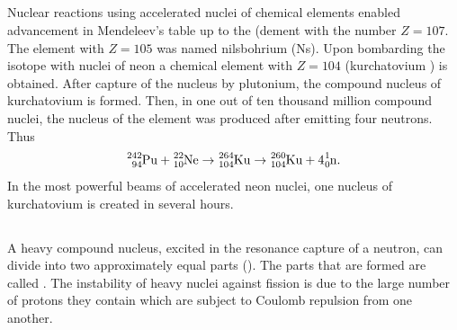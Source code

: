 \subsection{}\label{42.9.9} Nuclear reactions using accelerated nuclei of chemical elements enabled advancement in Mendeleev's table up to the (dement with the number $Z = 107$. The element with $Z = 105$ was named nilsbohrium (Ns). Upon bombarding the isotope  with nuclei of neon  a chemical element with $Z = 104$
(kurchatovium ) is obtained. After capture of the nucleus  by plutonium, the compound nucleus of kurchatovium  is formed. Then, in one out of ten thousand million compound
nuclei, the nucleus of the element  was produced after emitting four neutrons. Thus
\begin{equation*}
\ce{^{242}_{94}Pu} + \ce{^{22}_{10}Ne} \to \ce{^{264}_{104}Ku} \to \ce{^{260}_{104}Ku} + 4\ce{^{1}_{0}n}.
\end{equation*}
In the most powerful beams of accelerated neon nuclei, one nucleus of kurchatovium is created in several hours.

\subsection{}\label{42.9.10} A heavy compound nucleus, excited in the resonance capture of a neutron, can divide into two approximately equal parts (). The parts that are formed are called . The instability of heavy nuclei
against fission is due to the large number of protons they contain which are subject to Coulomb repulsion from one another.

